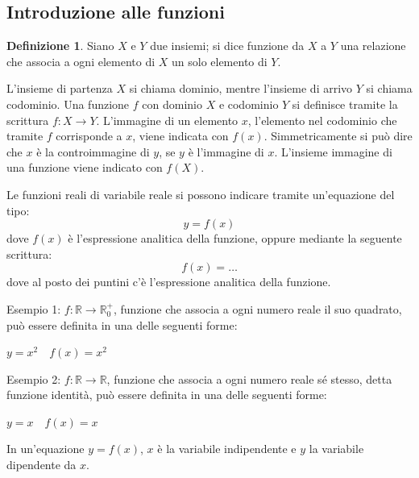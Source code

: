 \documentclass[a4paper]{article}
\theoremstyle{plain}
\theoremstyle{definition}
\newtheorem{definizione}{Definizione}
\theoremstyle{remark}
\newcommand{\R}{\mathbb{R}}
\begin{document}
\subsection{Introduzione alle funzioni}
\begin{definizione}
    Siano $X$ e $Y$ due insiemi; si dice funzione da $X$ a $Y$ una relazione che associa a ogni elemento di $X$ un solo elemento di $Y$.
\end{definizione}
L'insieme di partenza $X$ si chiama dominio, mentre l'insieme di arrivo $Y$ si chiama codominio. Una funzione $f$ con dominio $X$ e codominio $Y$ si definisce tramite la scrittura $f:X\to Y$. L'immagine di un elemento $x$, l'elemento nel codominio che tramite $f$ corrisponde a $x$, viene indicata con $f(x)$. Simmetricamente si può dire che $x$ è la controimmagine di $y$, se $y$ è l'immagine di $x$. L'insieme immagine di una funzione viene indicato con $f(X)$.

Le funzioni reali di variabile reale si possono indicare tramite un'equazione del tipo:
\begin{equation}
    y=f(x)
\end{equation}
dove $f(x)$ è l'espressione analitica della funzione, oppure mediante la seguente scrittura:
\begin{equation}
    f(x)=\dots
\end{equation}
dove al posto dei puntini c'è l'espressione analitica della funzione.

Esempio 1: $f:\R\to\R_0^+$, funzione che associa a ogni numero reale il suo quadrato, può essere definita in una delle seguenti forme:

$y=x^2\quad f(x)=x^2$

Esempio 2: $f:\R\to\R$, funzione che associa a ogni numero reale sé stesso, detta funzione identità, può essere definita in una delle seguenti forme:

$y=x\quad f(x)=x$

In un'equazione $y=f(x)$, $x$ è la variabile indipendente e $y$ la variabile dipendente da $x$.
\end{document}
